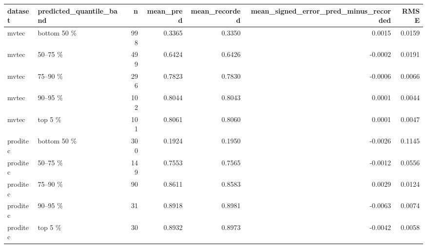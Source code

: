 \begin{tabular}{llrrrrr}
\toprule
 dataset & predicted\_quantile\_band &   n &  mean\_pred &  mean\_recorded &  mean\_signed\_error\_pred\_minus\_recorded &   RMSE \\
\midrule
   mvtec &             bottom 50 \% & 998 &     0.3365 &         0.3350 &                                 0.0015 & 0.0159 \\
   mvtec &                 50–75 \% & 499 &     0.6424 &         0.6426 &                                -0.0002 & 0.0191 \\
   mvtec &                 75–90 \% & 296 &     0.7823 &         0.7830 &                                -0.0006 & 0.0066 \\
   mvtec &                 90–95 \% & 102 &     0.8044 &         0.8043 &                                 0.0001 & 0.0044 \\
   mvtec &                 top 5 \% & 101 &     0.8061 &         0.8060 &                                 0.0001 & 0.0047 \\
proditec &             bottom 50 \% & 300 &     0.1924 &         0.1950 &                                -0.0026 & 0.1145 \\
proditec &                 50–75 \% & 149 &     0.7553 &         0.7565 &                                -0.0012 & 0.0556 \\
proditec &                 75–90 \% &  90 &     0.8611 &         0.8583 &                                 0.0029 & 0.0124 \\
proditec &                 90–95 \% &  31 &     0.8918 &         0.8981 &                                -0.0063 & 0.0074 \\
proditec &                 top 5 \% &  30 &     0.8932 &         0.8973 &                                -0.0042 & 0.0058 \\
\bottomrule
\end{tabular}

